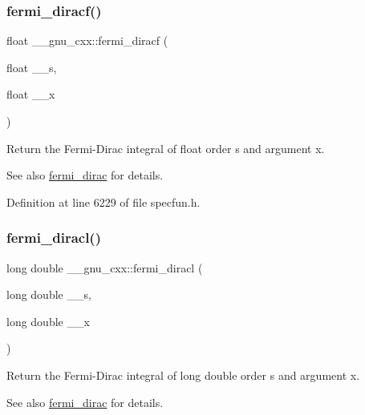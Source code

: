 \subsubsection{\texorpdfstring{fermi\+\_\+diracf()}{fermi\_diracf()}}
{\footnotesize\ttfamily float \+\_\+\+\_\+gnu\+\_\+cxx\+::fermi\+\_\+diracf (\begin{DoxyParamCaption}\item[{float}]{\+\_\+\+\_\+s,  }\item[{float}]{\+\_\+\+\_\+x }\end{DoxyParamCaption})\hspace{0.3cm}{\ttfamily [inline]}}

Return the Fermi-\/\+Dirac integral of {\ttfamily float} order s and argument x.

\begin{DoxySeeAlso}{See also}
\hyperlink{group__mathsf__gnu_ga5468fbaed5cb8384cff7cfb9d2188d1a}{fermi\+\_\+dirac} for details. 
\end{DoxySeeAlso}


Definition at line 6229 of file specfun.\+h.

\mbox{\label{group__mathsf__gnu_ga3876af54a92853036cc88ec6b8ea5d67}} 
\subsubsection{\texorpdfstring{fermi\+\_\+diracl()}{fermi\_diracl()}}
{\footnotesize\ttfamily long double \+\_\+\+\_\+gnu\+\_\+cxx\+::fermi\+\_\+diracl (\begin{DoxyParamCaption}\item[{long double}]{\+\_\+\+\_\+s,  }\item[{long double}]{\+\_\+\+\_\+x }\end{DoxyParamCaption})\hspace{0.3cm}{\ttfamily [inline]}}

Return the Fermi-\/\+Dirac integral of {\ttfamily  long double } order s and argument x.

\begin{DoxySeeAlso}{See also}
\hyperlink{group__mathsf__gnu_ga5468fbaed5cb8384cff7cfb9d2188d1a}{fermi\+\_\+dirac} for details. 
\end{DoxySeeAlso}


